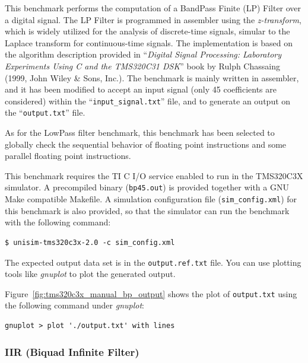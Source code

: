 This benchmark performs the computation of a BandPass Finite (LP) Filter over a digital signal.
The LP Filter is programmed in assembler using the \textit{z-transform}, which is widely utilized for the analysis of discrete-time signals, simular to the Laplace transform for continuous-time signals.
The implementation is based on the algorithm description provided in ``\textit{Digital Signal Processing: Laboratory Experiments Using C and the TMS320C31 DSK}'' book by Rulph Chassaing (1999, John Wiley \& Sons, Inc.).
The benchmark is mainly written in assembler, and it has been modified to accept an input signal (only 45 coefficients are considered) within the ``\texttt{input\_signal.txt}'' file, and to generate an output on the ``\texttt{output.txt}'' file.

As for the LowPass filter benchmark, this benchmark has been selected to globally check the sequential behavior of floating point instructions and some parallel floating point instructions.

This benchmark requires the TI C I/O service enabled to run in the TMS320C3X simulator.
A precompiled binary (\texttt{bp45.out}) is provided together with a GNU Make compatible Makefile.
A simulation configuration file (\texttt{sim\_config.xml}) for this benchmark is also provided, so that the simulator can run the benchmark with the following command:
  
\begin{verbatim}
$ unisim-tms320c3x-2.0 -c sim_config.xml
\end{verbatim}

The expected output data set is in the \texttt{output.ref.txt} file.
You can use plotting tools like \textit{gnuplot} to plot the generated output. 

Figure~\ref{fig:tms320c3x_manual_bp_output} shows the plot of \texttt{output.txt} using the following command under \textit{gnuplot}:

\begin{verbatim}
gnuplot > plot './output.txt' with lines
\end{verbatim}

\subsubsection{IIR (Biquad Infinite Filter)}

